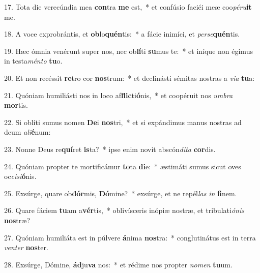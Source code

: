 17. Tota die verecúndia mea \textbf{con}tra \textbf{me} est,~*  et confúsio faciéi meæ coo\textit{pé}\textit{ru}\textbf{it} me.\

18. A voce exprobrántis, et \textbf{ob}lo\textbf{quén}tis:~*  a fácie inimíci, et \textit{per}\textit{se}\textbf{quén}tis.\

19. Hæc ómnia venérunt super nos, nec ob\textbf{lí}ti \textbf{su}mus te:~*  et iníque non égimus in testa\textit{mén}\textit{to} \textbf{tu}o.\

20. Et non recéssit \textbf{re}tro cor \textbf{nos}trum:~*  et declinásti sémitas nostras a \textit{vi}\textit{a} \textbf{tu}a:\

21. Quóniam humiliásti nos in loco af\textbf{flic}ti\textbf{ó}nis,~*  et coopéruit nos \textit{um}\textit{bra} \textbf{mor}tis.\

22. Si oblíti sumus nomen \textbf{De}i \textbf{nos}tri,~*  et si expándimus manus nostras ad deum \textit{a}\textit{li}\textbf{é}num:\

23. Nonne Deus re\textbf{quí}ret \textbf{is}ta?~*  ipse enim novit abscón\textit{di}\textit{ta} \textbf{cor}dis.\

24. Quóniam propter te mortificámur \textbf{to}ta \textbf{di}e:~*  æstimáti sumus sicut oves oc\textit{ci}\textit{si}\textbf{ó}nis.\

25. Exsúrge, quare ob\textbf{dór}mis, \textbf{Dó}mine?~*  exsúrge, et ne repél\textit{las} \textit{in} \textbf{fi}nem.\

26. Quare fáciem \textbf{tu}am a\textbf{vér}tis,~*  oblivísceris inópiæ nostræ, et tribulati\textit{ó}\textit{nis} \textbf{nos}træ?\

27. Quóniam humiliáta est in púlvere \textbf{á}nima \textbf{nos}tra:~*  conglutinátus est in terra \textit{ven}\textit{ter} \textbf{nos}ter.\

28. Exsúrge, Dómine, \textbf{ád}ju\textbf{va} nos:~*  et rédime nos propter \textit{no}\textit{men} \textbf{tu}um.\


